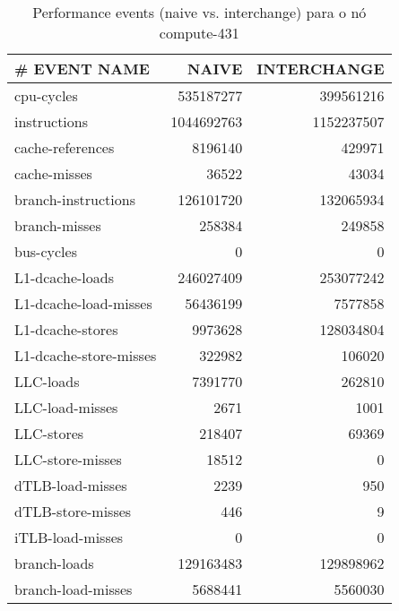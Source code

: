 \documentclass[conference,compsoc]{IEEEtran}
\begin{document}
  \begin{table}[H]
  \caption{Performance events (naive vs. interchange) para o nó compute-431}
  \label{table:search_events}
  \centering
  \begin{tabular}{ | l | r | r |   }

  \hline
  \# EVENT NAME	 & NAIVE  & INTERCHANGE \\ \hline 
  cpu-cycles  & 535187277  & 399561216         \\ \hline       
  instructions &       1044692763 &      1152237507      \\ \hline
  cache-references &      8196140 &    429971      \\ \hline
  cache-misses     &    36522 &     43034      \\ \hline
  branch-instructions & 126101720 & 132065934      \\ \hline
  branch-misses     &   258384 &  249858      \\ \hline
  bus-cycles       &       0 &    0      \\ \hline
   L1-dcache-loads  &  246027409 & 253077242     \\ \hline
 L1-dcache-load-misses & 56436199 & 7577858   \\ \hline
  L1-dcache-stores   &  9973628 & 128034804     \\ \hline
  L1-dcache-store-misses & 322982 &  106020     \\ \hline
  LLC-loads           &    7391770 & 262810     \\ \hline
  LLC-load-misses      &  2671 &  1001     \\ \hline
  LLC-stores          &  218407 & 69369     \\ \hline
  LLC-store-misses    &   18512 &    0     \\ \hline
  dTLB-load-misses    &   2239 & 950     \\ \hline
  dTLB-store-misses   &    446 &  9     \\ \hline
  iTLB-load-misses   &   0 &   0     \\ \hline
  branch-loads   & 129163483 & 129898962  \\ \hline    
  branch-load-misses &  5688441 & 5560030      \\ \hline
  \end{tabular}
  \end{table}
  
  
  
\end{document}
